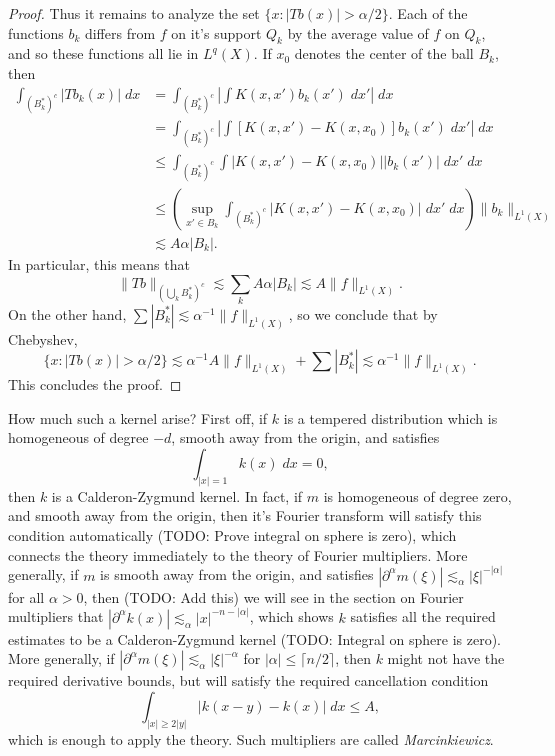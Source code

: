 \begin{proof}
    Thus it remains to analyze the set $\{ x : |Tb(x)| > \alpha / 2 \}$. Each of the functions $b_k$ differs from $f$ on it's support $Q_k$ by the average value of $f$ on $Q_k$, and so these functions all lie in $L^q(X)$. If $x_0$ denotes the center of the ball $B_k$, then
    \begin{align*}
        \int_{(B_k^*)^c} |Tb_k(x)|\; dx &= \int_{(B_k^*)^c} \left| \int K(x,x') b_k(x')\; dx' \right|\; dx\\
        &= \int_{(B_k^*)^c} \left| \int [K(x,x') - K(x,x_0)] b_k(x')\; dx' \right|\; dx\\
        &\leq \int_{(B_k^*)^c} \int |K(x,x') - K(x,x_0)| |b_k(x')|\; dx'\; dx\\
        &\leq \left( \sup_{x' \in B_k} \int_{(B_k^*)^c} |K(x,x') - K(x,x_0)|\; dx'\; dx \right) \| b_k \|_{L^1(X)}\\
        &\lesssim A \alpha |B_k|.
    \end{align*}
    In particular, this means that
    \[ \| Tb \|_{(\bigcup_k B_k^*)^c} \lesssim \sum_k A \alpha |B_k| \lesssim A \| f \|_{L^1(X)}. \]
    On the other hand, $\sum |B_k^*| \lesssim \alpha^{-1} \| f \|_{L^1(X)}$, so we conclude that by Chebyshev,
    \[ \{ x : |Tb(x)| > \alpha / 2 \} \lesssim \alpha^{-1} A \| f \|_{L^1(X)} + \sum |B_k^*| \lesssim \alpha^{-1} \| f \|_{L^1(X)}. \]
    This concludes the proof.
\end{proof}

How much such a kernel arise? First off, if $k$ is a tempered distribution which is homogeneous of degree $-d$, smooth away from the origin, and satisfies
%
\[ \int_{|x| = 1} k(x)\; dx = 0, \]
%
then $k$ is a Calderon-Zygmund kernel. In fact, if $m$ is homogeneous of degree zero, and smooth away from the origin, then it's Fourier transform will satisfy this condition automatically (TODO: Prove integral on sphere is zero), which connects the theory immediately to the theory of Fourier multipliers. More generally, if $m$ is smooth away from the origin, and satisfies $|\partial^\alpha m(\xi)| \lesssim_\alpha |\xi|^{-|\alpha|}$ for all $\alpha > 0$, then (TODO: Add this) we will see in the section on Fourier multipliers that $|\partial^\alpha k(x)| \lesssim_\alpha |x|^{-n-|\alpha|}$, which shows $k$ satisfies all the required estimates to be a Calderon-Zygmund kernel (TODO: Integral on sphere is zero). More generally, if $|\partial^\alpha m(\xi)| \lesssim_\alpha |\xi|^{-\alpha}$ for $|\alpha| \leq \lceil n/2 \rceil$, then $k$ might not have the required derivative bounds, but will satisfy the required cancellation condition
%
\[ \int_{|x| \geq 2 |y|} | k(x-y) - k(x)|\; dx \leq A, \]
%
which is enough to apply the theory. Such multipliers are called \emph{Marcinkiewicz}.




